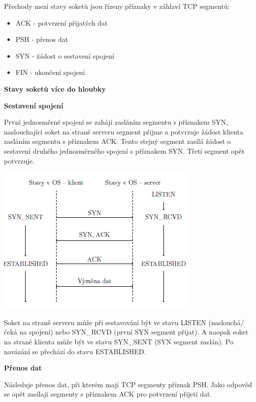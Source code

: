 Přechody mezi stavy soketů jsou řízeny příznaky v záhlaví TCP segmentů:
\begin{itemize}
    \item ACK - potvrzení přijatých dat
    \item PSH - přenos dat
    \item SYN - žádost o sestavení spojení
    \item FIN - ukončení spojení
\end{itemize}

\begin{Large}
    \vspace{0,5cm}
    \textbf{Stavy soketů více do hloubky}
\end{Large}

\vspace{0,5cm}
\textbf{Sestavení spojení}

První jednosměrné spojení se zahájí zasláním segmentu s příznakem SYN, naslouchající soket na straně serveru segment přijme a potvrzuje žádost klienta zasláním segmentu s příznakem ACK. Tento stejný segment zasílá žádost o sestavení druhého jednosměrného spojení s příznakem SYN. Třetí segment opět potvrzuje. 

\begin{center}
    \includegraphics[scale=1]{images/network_three_handshake.png}
\end{center}

Soket na straně serveru může při sestavování být ve stavu LISTEN (naslouchá/čeká na spojení) nebo SYN\_RCVD (první SYN segment přijat). A naopak soket na straně klienta může být ve stavu SYN\_SENT (SYN segment zaslán). Po navázání se přechází do stavu ESTABLISHED.

\vspace{0,5cm}
\textbf{Přenos dat}

Následuje přenos dat, při kterém mají TCP segmenty příznak PSH. Jako odpověď se opět zasílají segmenty s příznakem ACK pro potvrzení přijetí dat. 

